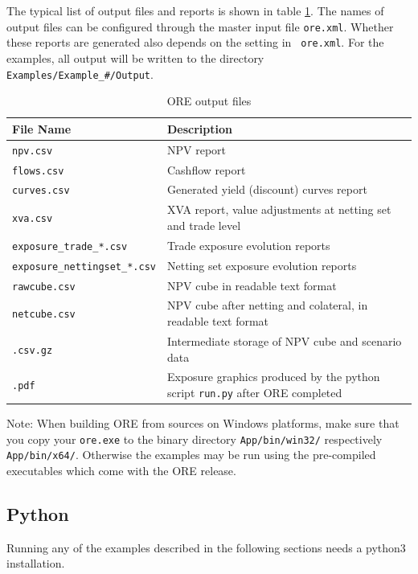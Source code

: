 The typical list of output files and reports is shown in table \ref{tab_2}. The names of output files can be configured
through the master input file {\tt ore.xml}. Whether these reports are generated also depends on the setting in {\tt
  ore.xml}. For the examples, all output will be written to the directory {\tt Examples/Example\_\#/Output}.

\begin{table}[h]
\scriptsize
\begin{center}
\begin{tabular}{|l|p{11cm}|}
\hline
File Name & Description \\
\hline
{\tt npv.csv}&   NPV report \\
{\tt flows.csv} & Cashflow report \\
{\tt curves.csv} & Generated yield (discount) curves report \\
{\tt xva.csv} & XVA report, value adjustments at netting set and trade level \\
{\tt exposure\_trade\_*.csv} & Trade exposure evolution reports\\
{\tt exposure\_nettingset\_*.csv} &  Netting set exposure evolution reports\\
{\tt rawcube.csv} & NPV cube in readable text format \\
{\tt netcube.csv} & NPV cube after netting and colateral, in readable text format \\
{\tt *.csv.gz} & Intermediate storage of NPV cube and scenario data \\
{\tt *.pdf} &  Exposure graphics produced by the python script {\tt run.py} after ORE completed\\
\hline
\end{tabular}
\end{center}
\caption{ORE output files}
\label{tab_2}
\end{table}

Note: When building ORE from sources on Windows platforms, make sure that you copy your {\tt ore.exe} to the binary
directory {\tt App/bin/win32/} respectively {\tt App/bin/x64/}. Otherwise the examples may be run using the pre-compiled
executables which come with the ORE release.

\subsection*{Python}

Running any of the examples described in the following sections needs a python3 installation.

